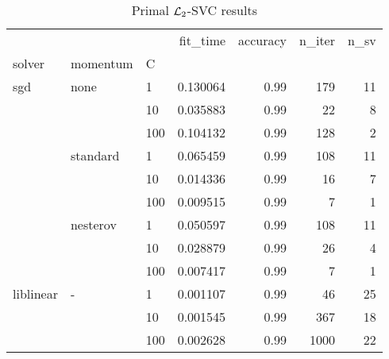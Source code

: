 \begin{table}[H]
\centering
\caption{Primal $\protect \mathcal{L}_2$-SVC results}
\label{primal_l2_svc_cv_results}
\begin{tabular}{lllrrrr}
\toprule
          &   &     &  fit\_time &  accuracy &  n\_iter &  n\_sv \\
solver & momentum & C &           &           &         &       \\
\midrule
sgd & none & 1   &  0.130064 &      0.99 &     179 &    11 \\
          &   & 10  &  0.035883 &      0.99 &      22 &     8 \\
          &   & 100 &  0.104132 &      0.99 &     128 &     2 \\
          & standard & 1   &  0.065459 &      0.99 &     108 &    11 \\
          &   & 10  &  0.014336 &      0.99 &      16 &     7 \\
          &   & 100 &  0.009515 &      0.99 &       7 &     1 \\
          & nesterov & 1   &  0.050597 &      0.99 &     108 &    11 \\
          &   & 10  &  0.028879 &      0.99 &      26 &     4 \\
          &   & 100 &  0.007417 &      0.99 &       7 &     1 \\
liblinear & - & 1   &  0.001107 &      0.99 &      46 &    25 \\
          &   & 10  &  0.001545 &      0.99 &     367 &    18 \\
          &   & 100 &  0.002628 &      0.99 &    1000 &    22 \\
\bottomrule
\end{tabular}
\end{table}
